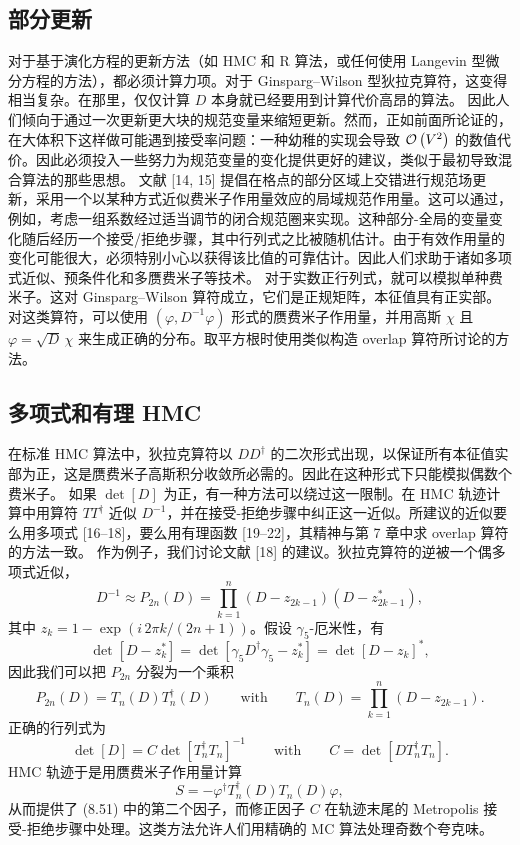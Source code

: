 \subsection{部分更新}

对于基于演化方程的更新方法（如 HMC 和 R 算法，或任何使用 Langevin 型微分方程的方法），都必须计算力项。对于 Ginsparg--Wilson 型狄拉克算符，这变得相当复杂。在那里，仅仅计算 $D$ 本身就已经要用到计算代价高昂的算法。
因此人们倾向于通过一次更新更大块的规范变量来缩短更新。然而，正如前面所论证的，在大体积下这样做可能遇到接受率问题：一种幼稚的实现会导致 $\mathcal{O}\left(V^2\right)$ 的数值代价。因此必须投入一些努力为规范变量的变化提供更好的建议，类似于最初导致混合算法的那些思想。
文献 [14, 15] 提倡在格点的部分区域上交错进行规范场更新，采用一个以某种方式近似费米子作用量效应的局域规范作用量。这可以通过，例如，考虑一组系数经过适当调节的闭合规范圈来实现。这种部分-全局的变量变化随后经历一个接受/拒绝步骤，其中行列式之比被随机估计。由于有效作用量的变化可能很大，必须特别小心以获得该比值的可靠估计。因此人们求助于诸如多项式近似、预条件化和多赝费米子等技术。
对于实数正行列式，就可以模拟单种费米子。这对 Ginsparg--Wilson 算符成立，它们是正规矩阵，本征值具有正实部。对这类算符，可以使用 $(\varphi, D^{-1}\varphi)$ 形式的赝费米子作用量，并用高斯 $\chi$ 且 $\varphi = \sqrt{D}\,\chi$ 来生成正确的分布。取平方根时使用类似构造 overlap 算符所讨论的方法。

\subsection{多项式和有理 HMC}

在标准 HMC 算法中，狄拉克算符以 $DD^\dagger$ 的二次形式出现，以保证所有本征值实部为正，这是赝费米子高斯积分收敛所必需的。因此在这种形式下只能模拟偶数个费米子。
如果 $\det[D]$ 为正，有一种方法可以绕过这一限制。在 HMC 轨迹计算中用算符 $TT^\dagger$ 近似 $D^{-1}$，并在接受-拒绝步骤中纠正这一近似。所建议的近似要么用多项式 [16--18]，要么用有理函数 [19--22]，其精神与第 7 章中求 overlap 算符的方法一致。
作为例子，我们讨论文献 [18] 的建议。狄拉克算符的逆被一个偶多项式近似，
\begin{equation}
D^{-1} \approx P_{2n}(D) = \prod_{k=1}^{n}(D - z_{2k-1})(D - z_{2k-1}^*),
\end{equation}
其中 $z_k = 1 - \exp(i\,2\pi k/(2n+1))$。假设 $\gamma_5$-厄米性，有
\begin{equation}
\det[D - z_k^*] = \det[\gamma_5 D^\dagger\gamma_5 - z_k^*] = \det[D - z_k]^*,
\end{equation}
因此我们可以把 $P_{2n}$ 分裂为一个乘积
\begin{equation}
P_{2n}(D) = T_n(D)T_n^\dagger(D) \qquad \text{with} \qquad
T_n(D) = \prod_{k=1}^{n}(D - z_{2k-1}).
\end{equation}
正确的行列式为
\begin{equation}
\det[D] = C\det[T_n^\dagger T_n]^{-1} \qquad \text{with} \qquad
C = \det[DT_n^\dagger T_n].
\end{equation}
HMC 轨迹于是用赝费米子作用量计算
\begin{equation}
S = -\varphi^\dagger T_n^\dagger(D)T_n(D)\varphi,
\end{equation}
从而提供了 (8.51) 中的第二个因子，而修正因子 $C$ 在轨迹末尾的 Metropolis 接受-拒绝步骤中处理。这类方法允许人们用精确的 MC 算法处理奇数个夸克味。

